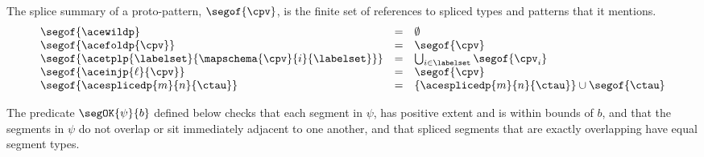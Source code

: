 \begin{grayparbox}
The splice summary of a proto-pattern, $\segof{\cpv}$, is the finite set of references to spliced types and patterns that it mentions.
\[
\begin{array}{lll}
\segof{\acewildp} & = & \emptyset\\
\segof{\acefoldp{\cpv}} & = & \segof{\cpv}\\
\segof{\acetplp{\labelset}{\mapschema{\cpv}{i}{\labelset}}} & = & \bigcup_{i \in \labelset} \segof{\cpv_i}\\
\segof{\aceinjp{\ell}{\cpv}} & = & \segof{\cpv}\\
\segof{\acesplicedp{m}{n}{\ctau}} & = & \{ \acesplicedp{m}{n}{\ctau} \} \cup \segof{\ctau}
\end{array}\]
\end{grayparbox}

The predicate $\segOK{\psi}{b}$ defined below checks that each segment in $\psi$, has positive extent and is within bounds of $b$, and that the segments in $\psi$ do not overlap or sit immediately adjacent to one another, and that spliced segments that are exactly overlapping have equal segment types.

